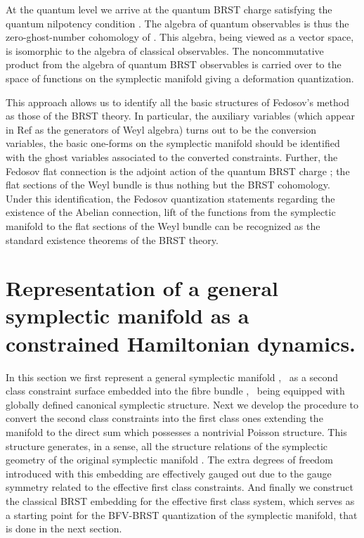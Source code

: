 \documentclass[a4paper,11pt,oneside]{amsart}
\theoremstyle{plain}
\numberwithin{equation}{section} %
\numberwithin{figure}{section} %
\providecommand{\qcommut}[2]{[#1,#2]_\star}
\renewcommand{\dim}[1]{{\rm dim}(#1)}
\def\mod{{\mathcal T}^*_\rho}
\def\manM{{\mathcal M}}
\begin{document}
\noindent
At the quantum level we arrive at the quantum BRST charge
\myHighlight{$\Omega$}\coordHE{} satisfying the quantum nilpotency condition
\myHighlight{$\qcommut{\Omega}{\Omega}=0$}\coordHE{}.  The algebra of quantum
observables is thus the
zero-ghost-number cohomology of \coordHE{}.  This algebra, being viewed
as a vector space, is isomorphic to the algebra
of classical observables. The noncommutative product
from the algebra of quantum BRST observables is carried over
to the space of functions on the symplectic manifold
giving a deformation quantization.


\noindent
This approach allows us to identify all the basic structures of
Fedosov's method as those of the BRST theory. In particular,
the auxiliary variables \coordHE{} (which appear in Ref \cite{[Fedosov-JDG]}
as the generators of Weyl algebra) turns out to be the conversion
variables, the basic
one-forms \coordHE{} on the symplectic manifold should be identified with the
ghost variables associated to the converted constraints.  Further, the
Fedosov flat connection \coordHE{} is the adjoint action of the quantum BRST charge
\myHighlight{$\Omega$}\coordHE{}; the flat sections of the Weyl bundle is thus nothing but the BRST
cohomology.
Under this identification, the Fedosov quantization statements
regarding the existence of the Abelian connection, lift of
the functions from the symplectic manifold to the flat sections
of the Weyl bundle can be recognized as the standard existence
theorems of the BRST theory.



\section{ Representation of a general symplectic
manifold as a constrained Hamiltonian dynamics.}

In this section we first represent a general symplectic
manifold \myHighlight{$\manM$}\coordHE{}, \, \myHighlight{$\dim{\manM}=N$}\coordHE{} as a second class
constraint surface embedded into the fibre bundle \myHighlight{$\mod\manM$}\coordHE{}, \,
\myHighlight{$\dim{\mod\manM}=2N$}\coordHE{} being equipped with globally defined canonical
symplectic structure. Next we develop the procedure to convert the
second class constraints into the first class ones extending the
manifold \myHighlight{$\mod\manM$}\coordHE{} to the direct sum  \myHighlight{$ \mod\manM \oplus T \manM$}\coordHE{}
which possesses a nontrivial Poisson structure.  This structure
generates, in a sense, all the structure relations of the
symplectic geometry of the original symplectic manifold \myHighlight{$\manM$}\coordHE{}.  The
extra degrees of freedom introduced with this embedding are
effectively gauged out due to the gauge symmetry related to the
effective first class constraints.  And finally we construct the
classical BRST embedding for the effective first class system, which
serves as a starting point for the BFV-BRST quantization of the
symplectic manifold, that is done in the next section.
\end{document}
